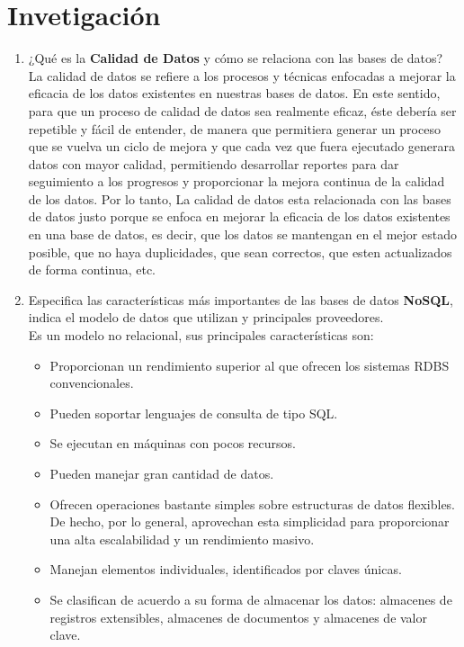 \documentclass[10pt]{article}
\begin{document}
    \section{Invetigación} \vspace{0.5cm}
    \begin{enumerate}[label=\alph*.]
        \item {
            ¿Qué es la \textbf{Calidad de Datos} y cómo se relaciona con las 
            bases de datos?}\\
        La calidad de datos se refiere a los
            procesos y técnicas enfocadas a mejorar la eficacia de los datos existentes en nuestras bases de
            datos. En este sentido, para que un proceso de calidad de datos sea realmente eficaz, éste debería
            ser repetible y fácil de entender, de manera que permitiera generar un proceso que se vuelva un
            ciclo de mejora y que cada vez que fuera ejecutado generara datos con mayor calidad, permitiendo
            desarrollar reportes para dar seguimiento a los progresos y proporcionar la mejora continua de la
            calidad de los datos. Por lo tanto, La calidad de datos esta relacionada con las bases de datos justo porque se enfoca en mejorar la eficacia de los datos existentes en una base de datos, es decir, que los datos se mantengan en el mejor estado posible, que no haya duplicidades, que sean correctos, que esten actualizados de forma continua, etc. \cite[pag. 6]{DQ} \\
            
            \item Especifica las características más importantes de las bases de datos \textbf{NoSQL}, indica el modelo
            de datos que utilizan y principales proveedores.\\
            Es un modelo no relacional, sus principales características son:
            \begin{itemize}
            	\item Proporcionan un rendimiento superior al que ofrecen los sistemas RDBS convencionales.
            	\item Pueden soportar lenguajes de consulta de tipo SQL.
            	\item Se ejecutan en máquinas con pocos recursos. 
            	\item Pueden manejar gran cantidad de datos.
            	\item Ofrecen operaciones bastante simples sobre estructuras de datos flexibles. De hecho, por lo general, aprovechan esta simplicidad para proporcionar una alta escalabilidad y un rendimiento masivo.
            	\item Manejan elementos individuales, identificados por claves únicas.
            	\item Se clasifican de acuerdo a su forma de almacenar los datos: almacenes de registros extensibles, almacenes de documentos y almacenes de valor clave.
            \end{itemize}
            

\end{enumerate}
\end{document}
